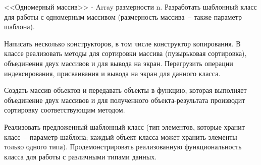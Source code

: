 
<<Одномерный массив>> - Array размерности n. Разработать шаблонный класс для работы
с одномерным массивом (размерность массива~-- также параметр шаблона).

Написать
несколько конструкторов, в том числе конструктор копирования. В классе реализовать
методы для сортировки массива (пузырьковая сортировка), объединения двух массивов и
для вывода на экран. Перегрузить операции индексирования, присваивания и вывода на
экран для данного класса.

Создать массив объектов и передавать объекты в функцию,
которая выполняет объединение двух массивов и для полученного объекта-результата
производит сортировку соответствующим методом.

Реализовать предложенный шаблонный класс (тип элементов, которые
хранит класс~-- параметр шаблона; каждый объект класса может хранить
элементы только одного типа). Продемонстрировать реализованную
функциональность класса для работы с различными типами данных.

